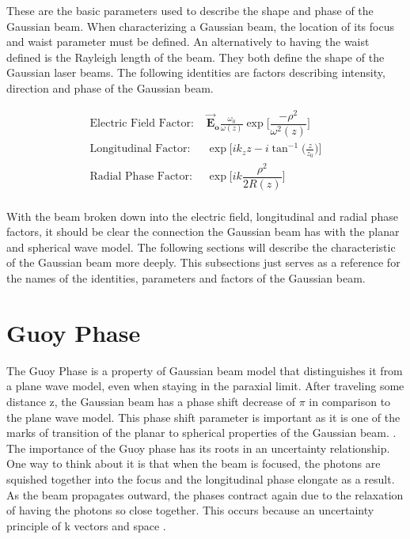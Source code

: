 \documentclass[11pt,a4paper]{book}
\begin{document}
		\noindent These are the basic parameters used to describe the shape and phase of the Gaussian beam. When characterizing a Gaussian beam, the location of its focus and waist parameter must be defined. An alternatively to having the waist defined is the Rayleigh length of the beam. They both define the shape of the Gaussian laser beams. The following identities are factors describing intensity, direction and phase of the Gaussian beam.
		
		\begin{equation}
		\label {eq:Gaussian Beam Factors}
		\begin{split}
		\text{Electric Field Factor: }& \vec{\textbf{E}}_\textbf{o} \frac{\omega_{0}}{\omega(z)}\exp\bigg[\dfrac{-\rho^2}{\omega^2(z)}\bigg]\\
		\text{Longitudinal Factor: }& \exp\bigg[ik_z z - i \tan^{-1} \bigg(\frac{z}{z_0} \bigg) \bigg]\\
		\text{Radial Phase Factor: }& \exp\bigg[ik \dfrac{\rho^2}{2R(z)}\bigg] \\
		\end{split}
		\end{equation}
		
		With the beam broken down into the electric field, longitudinal and radial phase factors, it should be clear the connection the Gaussian beam has with the planar and spherical wave model. The following sections will describe the characteristic of the Gaussian beam more deeply. This subsections just serves as a reference for the names of the identities, parameters and factors of the Gaussian beam.
		
	\section{Guoy Phase}
		\label{sec:Guoy Phase}
		The Guoy Phase is a property of Gaussian beam model that distinguishes it from a plane wave model, even when staying in the paraxial limit. After traveling some distance z, the Gaussian beam has a phase shift decrease of $\pi$ in comparison to the plane wave model. This phase shift parameter is important as it is one of the marks of transition of the planar to spherical properties of the Gaussian beam. . The importance of the Guoy phase has its roots in an uncertainty relationship. One way to think about it is that when the beam is focused, the photons are squished together into the focus and the longitudinal phase elongate as a result. As the beam propagates outward, the phases contract again due to the relaxation of having the photons so close together. This occurs because an uncertainty principle of k vectors and space \cite{}.  
		
\end{document}

